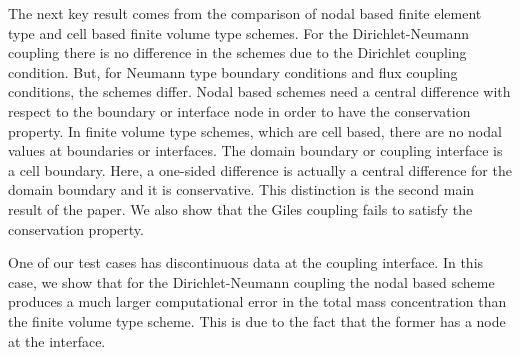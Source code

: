 The next key result comes from the comparison of nodal based finite element type and cell based finite volume type schemes. 
For the Dirichlet-Neumann coupling there is no difference in the schemes due to
the Dirichlet coupling condition. But, for Neumann type boundary conditions and
flux coupling conditions, the schemes differ. Nodal based schemes need a central
difference with respect to the boundary or interface node
in order to have the conservation property.
In finite volume type schemes, which are cell based, there are no nodal values 
at boundaries or interfaces. The domain boundary or coupling interface is a cell boundary. Here, a one-sided difference is actually a central difference 
for the domain boundary and it is conservative. This distinction is the second main result of the paper.
We also show that the Giles coupling 
\cite{GIL} fails to satisfy the conservation property. 

One of our test cases has discontinuous data at the coupling interface.
In this case, we show that for the Dirichlet-Neumann coupling the nodal based scheme produces a much larger 
computational error in the total mass concentration than the finite volume type scheme. This is due to the fact that the former has a node at the
interface.


